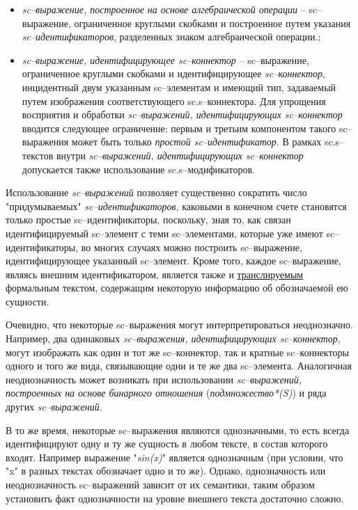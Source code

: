 \begin{itemize}
	\item{\textit{sc--выражение, построенное на основе алгебраической операции} -- sc--выражение, ограниченное круглыми скобками и построенное путем указания \textit{sc--идентификаторов}, разделенных знаком алгебраической операции.};
	\item{\textit{sc--выражение, идентифицирующее sc--коннектор} -- sc--выражение, ограниченное круглыми скобками и идентифицирующее \textit{sc--коннектор}, инцидентный двум указанным sc--элементам и имеющий тип, задаваемый путем изображения соответствующего sc.s--коннектора.
	Для упрощения восприятия и обработки \textit{sc--выражений, идентифицирующих sc--коннектор} вводится следующее ограничение: первым и третьим компонентом такого sc--выражения может быть только \textit{простой sc--идентификатор}. В рамках sc.s--текстов внутри \textit{sc--выражений, идентифицирующих sc--коннектор} допускается также использование sc.s--модификаторов.}	
\end{itemize}


Использование \textit{sc--выражений} позволяет существенно сократить число "придумываемых"{} \textit{sc--идентификаторов}, каковыми в конечном счете становятся только простые sc--идентификаторы, поскольку, зная то, как связан идентифицируемый sc--элемент с теми sc--элементами, которые уже имеют sc--идентификаторы, во многих случаях можно построить sc--выражение, идентифицирующее указанный sc--элемент. Кроме того, каждое sc--выражение, являясь внешним идентификатором, является также и \uline{транслируемым} формальным текстом, содержащим некоторую информацию об обозначаемой ею сущности.

Очевидно, что некоторые sc--выражения могут интерпретироваться неоднозначно. Например, два одинаковых \textit{sc--выражения, идентифицирующих sc--коннектор}, могут изображать как один и тот же sc--коннектор, так и кратные sc--коннекторы одного и того же вида, связывающие одни и те же два sc--элемента. Аналогичная неоднозначность может возникать при использовании \textit{sc--выражений, построенных на основе бинарного отношения} (\textit{подмножество*(S)}) и ряда других \textit{sc--выражений}.

В то же время, некоторые sc--выражения являются однозначными, то есть всегда идентифицируют одну и ту же сущность в любом тексте, в состав которого входят. Например выражение "\textit{sin(x)}"{} является однозначным (при условии, что "x"{} в разных текстах обозначает одно и то же). Однако, однозначность или неоднозначность sc--выражений зависит от их семантики, таким образом установить факт однозначности на уровне внешнего текста достаточно сложно.

